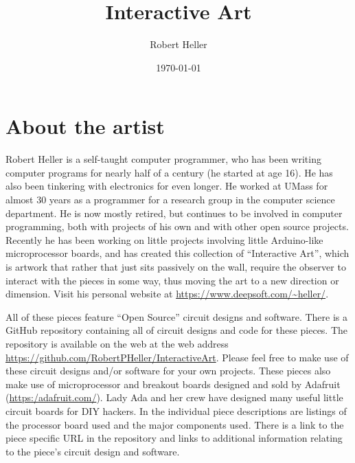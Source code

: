 \documentclass[12pt]{article}
\title{Interactive Art}
\author{Robert Heller}
\date{\today}
\begin{document}
\maketitle


\section*{About the artist}

Robert Heller is a self-taught computer programmer, who has been writing 
computer programs for nearly half of a century (he started at age 16).  He has 
also been tinkering with electronics for even longer.  He worked at UMass 
for almost 30 years as a programmer for a research group in the computer 
science department.  He is now mostly retired, but continues to be involved in 
computer programming, both with projects of his own and with other open source 
projects.  Recently he has been working on little projects involving 
little Arduino-like microprocessor boards, and has created this collection of 
``Interactive Art'', which is artwork that rather that just sits passively on 
the wall, require the observer to interact with the pieces in some way, thus 
moving the art to a new direction or dimension. Visit his personal website at 
\url{https://www.deepsoft.com/~heller/}.


All of these pieces feature ``Open Source'' circuit designs and software.
There is a GitHub repository containing all of circuit designs and code for
these pieces. The repository is available on the web at the web address
\url{https://github.com/RobertPHeller/InteractiveArt}.
Please feel free to make use of these circuit designs and/or software for your
own projects. These pieces also make use of microprocessor and breakout boards
designed and sold by Adafruit
(\url{https:/adafruit.com/}). Lady
Ada and her crew have designed many useful little circuit boards for DIY
hackers.  In the individual piece descriptions are listings of the processor 
board used and the major components used.  There is a link to the piece 
specific URL in the repository and links to additional information relating to 
the piece's circuit design and software.
\end{document}
